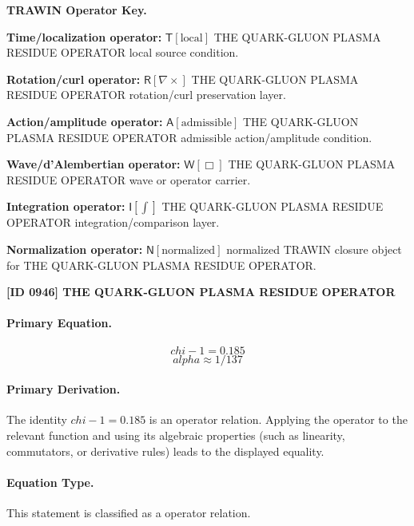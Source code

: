 \par\vspace{0.45\baselineskip}
\noindent\begin{minipage}[t]{\linewidth}
\begingroup
\small
\raggedright
\textbf{TRAWIN Operator Key.}\par
\noindent\textbf{Time/localization operator:} $\mathsf{T}\!\left[\mathrm{local}\right]$ THE QUARK-GLUON PLASMA RESIDUE OPERATOR local source condition.\par
\noindent\textbf{Rotation/curl operator:} $\mathsf{R}\!\left[\nabla\times\right]$ THE QUARK-GLUON PLASMA RESIDUE OPERATOR rotation/curl preservation layer.\par
\noindent\textbf{Action/amplitude operator:} $\mathsf{A}\!\left[\mathrm{admissible}\right]$ THE QUARK-GLUON PLASMA RESIDUE OPERATOR admissible action/amplitude condition.\par
\noindent\textbf{Wave/d'Alembertian operator:} $\mathsf{W}\!\left[\Box\right]$ THE QUARK-GLUON PLASMA RESIDUE OPERATOR wave or operator carrier.\par
\noindent\textbf{Integration operator:} $\mathsf{I}\!\left[\int\right]$ THE QUARK-GLUON PLASMA RESIDUE OPERATOR integration/comparison layer.\par
\noindent\textbf{Normalization operator:} $\mathsf{N}\!\left[\mathrm{normalized}\right]$ normalized TRAWIN closure object for THE QUARK-GLUON PLASMA RESIDUE OPERATOR.\par
\endgroup
\end{minipage}

\clearpage
\noindent\textbf{[ID 0946] THE QUARK-GLUON PLASMA RESIDUE OPERATOR}\par
\vspace{0.35em}
\paragraph{Primary Equation.}
\[
chi - 1 = 0.185
\]
\[
alpha \approx 1/137
\]

\paragraph{Primary Derivation.}
The identity \( chi - 1 = 0.185 \) is an operator relation. Applying the operator to the relevant function and using its algebraic properties (such as linearity, commutators, or derivative rules) leads to the displayed equality.
\paragraph{Equation Type.}
This statement is classified as a operator relation.

